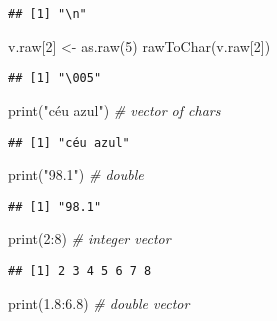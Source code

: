 \documentclass[
]{article}
\newenvironment{Shaded}{\begin{snugshade}}{\end{snugshade}}
\newcommand{\CommentTok}[1]{\textcolor[rgb]{0.56,0.35,0.01}{\textit{#1}}}
\newcommand{\DecValTok}[1]{\textcolor[rgb]{0.00,0.00,0.81}{#1}}
\newcommand{\FloatTok}[1]{\textcolor[rgb]{0.00,0.00,0.81}{#1}}
\newcommand{\FunctionTok}[1]{\textcolor[rgb]{0.00,0.00,0.00}{#1}}
\newcommand{\NormalTok}[1]{#1}
\newcommand{\OtherTok}[1]{\textcolor[rgb]{0.56,0.35,0.01}{#1}}
\newcommand{\SpecialCharTok}[1]{\textcolor[rgb]{0.00,0.00,0.00}{#1}}
\newcommand{\StringTok}[1]{\textcolor[rgb]{0.31,0.60,0.02}{#1}}
\begin{document}
\begin{verbatim}
## [1] "\n"
\end{verbatim}

\begin{Shaded}
\begin{Highlighting}[]
\NormalTok{v.raw[}\DecValTok{2}\NormalTok{] }\OtherTok{\textless{}{-}} \FunctionTok{as.raw}\NormalTok{(}\DecValTok{5}\NormalTok{)}
\FunctionTok{rawToChar}\NormalTok{(v.raw[}\DecValTok{2}\NormalTok{])}
\end{Highlighting}
\end{Shaded}

\begin{verbatim}
## [1] "\005"
\end{verbatim}

\begin{Shaded}
\begin{Highlighting}[]
\FunctionTok{print}\NormalTok{(}\StringTok{"céu azul"}\NormalTok{) }\CommentTok{\# vector of chars}
\end{Highlighting}
\end{Shaded}

\begin{verbatim}
## [1] "céu azul"
\end{verbatim}

\begin{Shaded}
\begin{Highlighting}[]
\FunctionTok{print}\NormalTok{(}\StringTok{"98.1"}\NormalTok{) }\CommentTok{\# double}
\end{Highlighting}
\end{Shaded}

\begin{verbatim}
## [1] "98.1"
\end{verbatim}

\begin{Shaded}
\begin{Highlighting}[]
\FunctionTok{print}\NormalTok{(}\DecValTok{2}\SpecialCharTok{:}\DecValTok{8}\NormalTok{) }\CommentTok{\# integer vector}
\end{Highlighting}
\end{Shaded}

\begin{verbatim}
## [1] 2 3 4 5 6 7 8
\end{verbatim}

\begin{Shaded}
\begin{Highlighting}[]
\FunctionTok{print}\NormalTok{(}\FloatTok{1.8}\SpecialCharTok{:}\FloatTok{6.8}\NormalTok{) }\CommentTok{\# double vector}
\end{Highlighting}
\end{Shaded}
\end{document}
